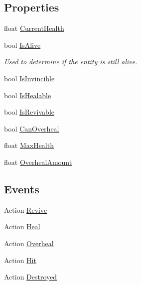 \subsection*{Properties}
\begin{DoxyCompactItemize}
\item 
float \hyperlink{class_health_system_ac252024753768287f4e6c07657f03a95}{Current\+Health}
\item 
bool \hyperlink{class_health_system_a07ce65ebdae45aef952ed6858441c3d9}{Is\+Alive}
\begin{DoxyCompactList}\small\item\em Used to determine if the entity is still alive. \end{DoxyCompactList}\item 
bool \hyperlink{class_health_system_ac3c807d6326bcf69776a4ab1ac2fcdc4}{Is\+Invincible}
\item 
bool \hyperlink{class_health_system_adeccc5512c7caf9c87ccb7c2ddda582c}{Is\+Healable}
\item 
bool \hyperlink{class_health_system_a08239b7099b339a01e184875c322497a}{Is\+Revivable}
\item 
bool \hyperlink{class_health_system_af7bb446d9ab48284d61dbf387aa8bcfb}{Can\+Overheal}
\item 
float \hyperlink{class_health_system_a125978d7fdab158cc4799642576c0749}{Max\+Health}
\item 
float \hyperlink{class_health_system_a56a1a326a2d7a3039a8f512e1d4d7858}{Overheal\+Amount}
\end{DoxyCompactItemize}
\subsection*{Events}
\begin{DoxyCompactItemize}
\item 
Action \hyperlink{class_health_system_aa19ec8cdd69e9a033a76db175705a5a1}{Revive}
\item 
Action \hyperlink{class_health_system_ad80f0c290068df042b13b87e19329cbb}{Heal}
\item 
Action \hyperlink{class_health_system_a9f23dd550d7ab148c5051acc2d224ff5}{Overheal}
\item 
Action \hyperlink{class_health_system_ac6978d7d085bfad1c33b6ddaaac113ae}{Hit}
\item 
Action \hyperlink{class_health_system_aff4f590a604a12cd794a853764904e1f}{Destroyed}
\end{DoxyCompactItemize}


